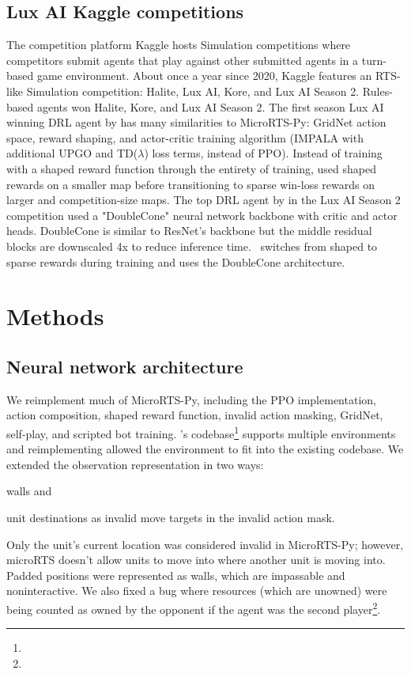 \documentclass{article}
\begin{document}
\subsection{Lux AI Kaggle competitions}
The competition platform Kaggle hosts Simulation competitions where competitors
submit agents that play against other submitted agents in a turn-based game
environment. About once a year since 2020, Kaggle features an RTS-like Simulation competition:
Halite, Lux AI, Kore, and Lux AI Season 2. Rules-based agents won Halite, Kore, and Lux
AI Season 2. The first season Lux AI winning DRL agent by \citet{lux-ai-2021-winner} 
has many similarities to MicroRTS-Py: GridNet action space, reward shaping, and
actor-critic training algorithm (IMPALA with additional UPGO and TD($\lambda$) loss
terms, instead of PPO). Instead
of training with a shaped reward function through the entirety of training, \citet{lux-ai-2021-winner}
used shaped rewards on a smaller map before transitioning to sparse win-loss rewards on
larger and competition-size maps. The top DRL agent by \citet{Ferdinand2021doublecone} in the Lux AI Season 2 competition used a "DoubleCone" neural
network backbone with critic and actor heads. DoubleCone is similar to ResNet's backbone but the 
middle residual blocks are downscaled 4x to reduce inference time.
\agentName\ switches from shaped to sparse rewards during training and uses the DoubleCone architecture.


\section{Methods}
\subsection{Neural network architecture}
We reimplement much of MicroRTS-Py, including the PPO implementation, action
composition, shaped reward function, invalid action masking, GridNet, self-play, and
scripted bot training. \agentName's codebase\footnote{\rlAlgoImplsGitHubUrl} supports 
multiple environments and reimplementing allowed the environment to fit into the 
existing codebase. We extended the observation representation in two ways:
\begin{inparaenum}[(1)]
    \item walls and
    \item unit destinations as invalid move targets in the invalid action mask.
\end{inparaenum}
Only the unit's current location was considered invalid in MicroRTS-Py; however, 
microRTS doesn't allow units to move into where another unit is moving into.
Padded positions were represented as walls, which are impassable and noninteractive. 
We also fixed a bug where resources (which are unowned) were being counted as
owned by the opponent if the agent was the second
player\footnote{\unownedFixGitHubCommit}.
\end{document}
